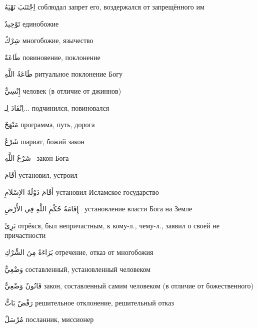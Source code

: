 \documentclass[a5paper]{article}
\newcommand\textstyleDropCaps[1]{#1}
\newcommand\textstyleCaptioncharacters[1]{#1}
\begin{document}
\textstyleCaptioncharacters{اِجْتَنَبَ نَهْيَهُ }\textstyleDropCaps{соблюдал запрет его, воздержался от запрещённого им‎}

\textstyleCaptioncharacters{تَوْحِيدٌ }\textstyleDropCaps{единобожие‎}

\textstyleCaptioncharacters{شِرْكٌ }\textstyleDropCaps{многобожие, языче­ство‎}

\textstyleCaptioncharacters{طَاعَةٌ }\textstyleDropCaps{повиновение, покло­нение‎}

\textstyleCaptioncharacters{طَاعَةُ اللَّهِ }\textstyleDropCaps{ритуальное поклонение Богу‎}

\textstyleCaptioncharacters{إِنْسِيٌّ }\textstyleDropCaps{человек (в отличие от джиннов)‎}

\textstyleCaptioncharacters{اِنْقَادَ لِـ... }\textstyleDropCaps{подчинился, по­виновался‎}

\textstyleCaptioncharacters{مَنْهَجٌ }\textstyleDropCaps{программа, путь, до­рога‎}

\textstyleCaptioncharacters{شَرْعٌ }\textstyleDropCaps{шариат, божий закон‎}

\textstyleCaptioncharacters{شَرْعُ اللَّهِ \ }\textstyleDropCaps{закон Бога ‎}

\textstyleCaptioncharacters{أَقَامَ }\textstyleDropCaps{установил, устроил‎}

\textstyleCaptioncharacters{أَقَامَ دَوْلَةَ الإِسْلاَمِ }\textstyleDropCaps{установил Исламское государство ‎}

\textstyleCaptioncharacters{إِقَامَةُ حُكْمِ اللَّهِ فِي الأَرْضِ \ }\textstyleDropCaps{установление власти Бога на Земле ‎}

\textstyleCaptioncharacters{بَرِئَ }\textstyleDropCaps{отрёкся, был непри­частным, к кому-л., чему-л., заявил о своей не причастности ‎}

\textstyleCaptioncharacters{بَرَاءَةٌ مِنَ الشِّرْكِ }\textstyleDropCaps{отре­чение, отказ от многобожия ‎}

\textstyleCaptioncharacters{وَضْعِيٌّ }\textstyleDropCaps{составленный, установленный человеком‎}

\textstyleCaptioncharacters{قَانُونٌ وَضْعِيٌّ }\textstyleDropCaps{закон, со­ставленный самим человеком (в отличие от }\textstyleDropCaps{божественного)‎}

\textstyleCaptioncharacters{رَفْضٌ بَاتٌّ }\textstyleDropCaps{решительное отклонение, решительный отказ‎}

\textstyleCaptioncharacters{مُرْسَلٌ }\textstyleDropCaps{посланник, мис­сионер‎}
\end{document}
